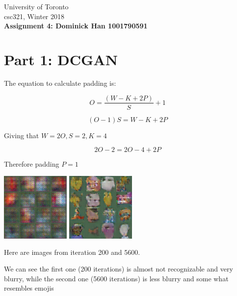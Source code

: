 \documentclass{article}
\begin{document}
\noindent
University of Toronto\\
{\sc csc}321, Winter 2018\\[10pt]
{\LARGE\bf Assignment 4: Dominick Han 1001790591} \\[10pt]
\section*{Part 1: DCGAN}
The equation to calculate padding is:

$$O=\frac{(W-K+2P)}{S}+1$$

$$(O-1)S=W-K+2P$$

Giving that $W=2O, S=2, K=4$

$$2O-2=2O-4+2P$$

Therefore padding $P=1$



\includegraphics{samples_vanilla/sample-000200.png}
\includegraphics{samples_vanilla/sample-005600.png}

Here are images from iteration 200 and 5600.

We can see the first one (200 iterations) is almost not recognizable and very blurry, while the second one (5600 iterations) is less blurry and some what resembles emojis
\newpage
\end{document}
